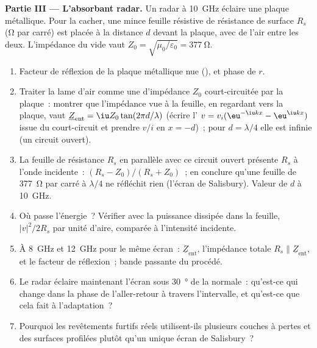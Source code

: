 \begin{problem}
\medskip
\noindent\textbf{Partie III --- L'absorbant radar.}
Un radar à \qty{10}{GHz} éclaire une plaque métallique. Pour la cacher, une mince
feuille résistive de résistance de surface $R_s$ (\unit{\ohm} par carré) est
placée à la distance $d$ devant la plaque, avec de l'air entre les deux.
L'impédance du vide vaut $Z_0 = \sqrt{\mu_0/\varepsilon_0} = \qty{377}{\ohm}$.
\begin{enumerate}[resume]
  \item Facteur de réflexion de la plaque métallique nue (), et
        phase de $r$.
  \item Traiter la lame d'air comme une  d'impédance $Z_0$
        court-circuitée par la plaque~: montrer que l'impédance vue à la
        feuille, en regardant vers la plaque, vaut $\underline Z_{\text{ent}} = \iu Z_0
        \tan(2\pi d/\lambda)$ (écrire l' $v = v_i(\eu^{-\iu kx} -
        \eu^{\iu kx})$ issue du court-circuit et prendre $v/i$ en $x = -d$)~; pour $d =
        \lambda/4$ elle est infinie (un circuit ouvert).
  \item La feuille de résistance $R_s$ en parallèle avec ce circuit
        ouvert présente $R_s$ à l'onde incidente~:  $(R_s - Z_0)/(R_s + Z_0)$~; en conclure qu'une feuille de
        \qty{377}{\ohm} par carré à $\lambda/4$ ne réfléchit rien (l'écran
        de Salisbury). Valeur de $d$ à \qty{10}{GHz}.
  \item Où passe l'énergie~? Vérifier avec la puissance dissipée
        dans la feuille, $|v|^2/2R_s$ par unité d'aire, comparée à l'intensité
        incidente.
  \item À \qty{8}{GHz} et \qty{12}{GHz} pour le même écran~: $\underline Z_{\text{ent}}$,
        l'impédance totale $R_s \parallel \underline Z_{\text{ent}}$, et le
        facteur de réflexion~; bande passante du procédé.
  \item Le radar éclaire maintenant l'écran sous \qty{30}{\degree} de
        la normale~: qu'est-ce qui change dans la phase de l'aller-retour
        à travers l'intervalle, et qu'est-ce que cela fait à l'adaptation~?
  \item Pourquoi les revêtements furtifs réels utilisent-ils plusieurs couches à pertes
        et des surfaces profilées plutôt qu'un unique écran de Salisbury~?
\end{enumerate}


\end{problem}
